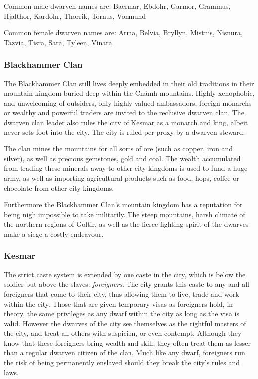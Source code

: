 Common male dwarven names are: Baermar, Ebdohr, Garmor, Grammus, Hjalthor,
Kardohr, Thorrik, Tornus, Vonmund

Common female dwarven names are: Arma, Belvia, Bryllyn, Mistnis, Nisnura, Tazvia,
Tisra, Sara, Tyleen, Vinara

\subsubsection{Blackhammer Clan}
\label{sec:Blackhammer Clan}

The Blackhammer Clan still lives deeply embedded in their old traditions in
their mountain kingdom buried deep within the Cnámh mountains. Highly
xenophobic, and unwelcoming of outsiders, only highly valued ambassadors,
foreign monarchs or wealthy and powerful traders are invited to the reclusive
dwarven clan. The dwarven clan leader also rules the city of Kesmar as a
monarch and king, albeit never sets foot into the city. The city is ruled per
proxy by a dwarven steward.

The clan mines the mountains for all sorts of ore (such as copper, iron and
silver), as well as precious gemstones, gold and coal. The wealth accumulated
from trading these minerals away to other city kingdoms is used to fund a huge
army, as well as importing agricultural products such as food, hops, coffee or
chocolate from other city kingdoms.

Furthermore the Blackhammer Clan's mountain kingdom has a reputation for being
nigh impossible to take militarily. The steep mountains, harsh climate of the
northern regions of Goltir, as well as the fierce fighting spirit of the dwarves
make a siege a costly endeavour.

\subsubsection{Kesmar}

The strict caste system is extended by one caste in the city, which is below
the soldier but above the slaves: \emph{foreigners}. The city grants this
caste to any and all foreigners that come to their city, thus allowing them to
live, trade and work within the city. Those that are given temporary visas as
foreigners hold, in theory, the same privileges as any dwarf within the city
as long as the visa is valid. However the dwarves of the city see themselves
as the rightful masters of the city, and treat all others with suspicion, or
even contempt. Although they know that these foreigners bring wealth and skill,
they often treat them as lesser than a regular dwarven citizen of the clan.
Much like any dwarf, foreigners run the risk of being permanently enslaved
should they break the city's rules and laws.

